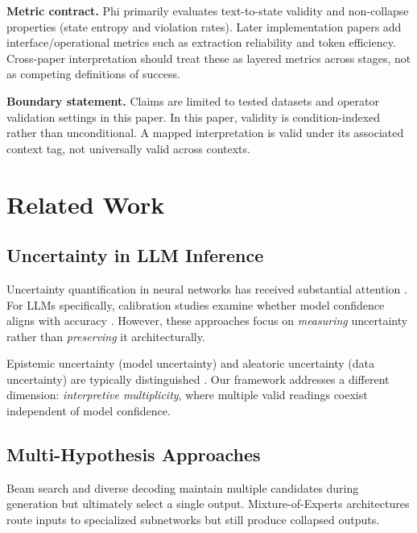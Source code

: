 \documentclass[11pt,a4paper]{article}
\begin{document}
\textbf{Metric contract.} Phi primarily evaluates text-to-state validity and
non-collapse properties (state entropy and violation rates). Later
implementation papers add interface/operational metrics such as extraction
reliability and token efficiency. Cross-paper interpretation should treat these
as layered metrics across stages, not as competing definitions of success.

\textbf{Boundary statement.} Claims are limited to tested datasets and operator
validation settings in this paper.
In this paper, validity is condition-indexed rather than unconditional.
A mapped interpretation is valid under its associated context tag, not universally valid across contexts.

\section{Related Work}
\label{sec:related}

\subsection{Uncertainty in LLM Inference}

Uncertainty quantification in neural networks has received substantial attention 
\cite{gal2016dropout, lakshminarayanan2017simple}. For LLMs specifically, calibration 
studies examine whether model confidence aligns with accuracy \cite{kadavath2022language}. 
However, these approaches focus on \textit{measuring} uncertainty rather than 
\textit{preserving} it architecturally.

Epistemic uncertainty (model uncertainty) and aleatoric uncertainty (data uncertainty) 
are typically distinguished \cite{hullermeier2021aleatoric}. Our framework addresses a 
different dimension: \textit{interpretive multiplicity}, where multiple valid readings 
coexist independent of model confidence.

\subsection{Multi-Hypothesis Approaches}

Beam search and diverse decoding \cite{vijayakumar2016diverse} 
maintain multiple candidates during generation but ultimately select a single output. 
Mixture-of-Experts architectures \cite{shazeer2017outrageously, fedus2021switch} route 
inputs to specialized subnetworks but still produce collapsed outputs.
\end{document}
